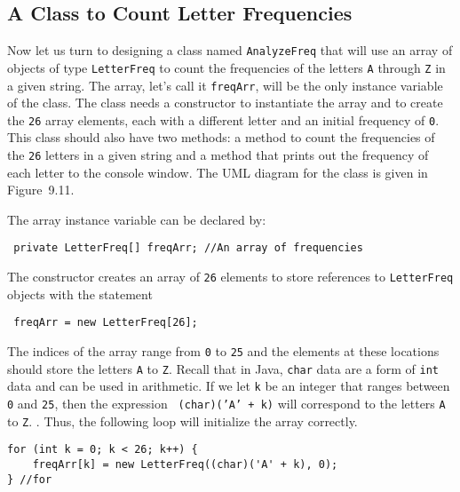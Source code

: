 \subsection{A Class to Count Letter Frequencies}

\noindent Now let us turn to designing a class named {\tt AnalyzeFreq}
that will use an array of objects of type {\tt LetterFreq} to count
the frequencies of the letters {\tt A} through {\tt Z} in a given
string.  The array, let's call it {\tt freqArr}, will be the only
instance variable of the class.  The class needs a constructor to
instantiate the array and to create the {\tt 26} array elements, each
with a different letter and an initial frequency of {\tt 0}.  This
class should also have two methods: a method to count the frequencies
of the {\tt 26} letters in a given string and a method that prints out
the frequency 
of each letter to the console window.  The UML diagram for the class
is given in Figure~9.11.

The array instance variable can be declared by:

\begin{jjjlisting}
\begin{lstlisting}
 private LetterFreq[] freqArr; //An array of frequencies
\end{lstlisting}
\end{jjjlisting}

\noindent The constructor creates an array of {\tt 26} elements to
store references to {\tt LetterFreq} objects with the statement

\begin{jjjlisting}
\begin{lstlisting}
 freqArr = new LetterFreq[26];
\end{lstlisting}
\end{jjjlisting}

\noindent The indices of the array range from {\tt 0} to {\tt 25} and
the elements at these locations should store the letters {\tt A} to
{\tt Z}.  Recall that in Java, {\tt char} data are a form of {\tt int}
data and can be used in arithmetic.  If we let {\tt k} be an integer
that ranges between {\tt 0} and {\tt 25}, then the expression {\tt
(char)('A' + k)} will correspond to the letters {\tt A} to {\tt Z}.  .
Thus, the following loop will initialize the array correctly.  

\begin{jjjlisting}
\begin{lstlisting}
for (int k = 0; k < 26; k++) {
    freqArr[k] = new LetterFreq((char)('A' + k), 0);
} //for
\end{lstlisting}
\end{jjjlisting}

